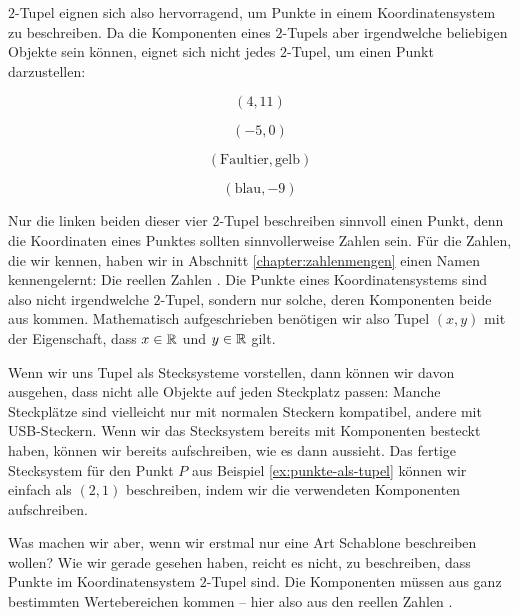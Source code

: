 \documentclass[../../main.tex]{subfiles}
\begin{document}
$2$-Tupel eignen sich also hervorragend, um Punkte in einem Koordinatensystem zu beschreiben. Da die Komponenten eines $2$-Tupels aber irgendwelche beliebigen Objekte sein können, eignet sich nicht jedes $2$-Tupel, um einen Punkt darzustellen:
\begin{multicols}{4}
    \[(4,11)\]

    \[(-5,0)\]

    \[(\text{Faultier},\text{gelb})\]

    \[(\text{blau},-9)\]
\end{multicols}
Nur die linken beiden dieser vier $2$-Tupel beschreiben sinnvoll einen Punkt, denn die Koordinaten eines Punktes sollten sinnvollerweise Zahlen sein. Für die Zahlen, die wir kennen, haben wir in Abschnitt \ref{chapter:zahlenmengen} einen Namen kennengelernt: Die reellen Zahlen \Real. Die Punkte eines Koordinatensystems sind also nicht irgendwelche $2$-Tupel, sondern nur solche, deren Komponenten beide aus \Real kommen. Mathematisch aufgeschrieben benötigen wir also Tupel $(x,y)$ mit der Eigenschaft, dass $x\in\mathbb{R}$ und $y\in\mathbb{R}$ gilt.

Wenn wir uns Tupel als Stecksysteme vorstellen, dann können wir davon ausgehen, dass nicht alle Objekte auf jeden Steckplatz passen: Manche Steckplätze sind vielleicht nur mit normalen Steckern kompatibel, andere mit USB-Steckern. Wenn wir das Stecksystem bereits mit Komponenten besteckt haben, können wir bereits aufschreiben, wie es dann aussieht. Das fertige Stecksystem für den Punkt $P$ aus Beispiel \ref{ex:punkte-als-tupel} können wir einfach als $(2,1)$ beschreiben, indem wir die verwendeten Komponenten aufschreiben.

Was machen wir aber, wenn wir erstmal nur eine Art Schablone beschreiben wollen? Wie wir gerade gesehen haben, reicht es nicht, zu beschreiben, dass Punkte im Koordinatensystem $2$-Tupel sind. Die Komponenten müssen aus ganz bestimmten Wertebereichen kommen -- hier also aus den reellen Zahlen \Real.
\end{document}

